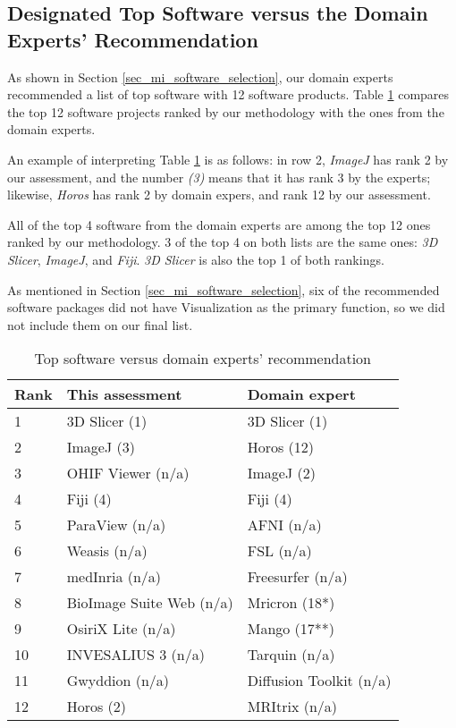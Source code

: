\subsection{Designated Top Software versus the Domain Experts' Recommendation}
\label{sec_designation_vs_experts}

As shown in Section \ref{sec_mi_software_selection}, our domain experts recommended a list of top software with 12 software products. Table \ref{tab_top_software_vs_experts} compares the top 12 software projects ranked by our methodology with the ones from the domain experts.

An example of interpreting Table \ref{tab_top_software_vs_experts} is as follows: in row 2, \textit{ImageJ} has rank 2 by our assessment, and the number \textit{(3)} means that it has rank 3 by the experts; likewise, \textit{Horos} has rank 2 by domain expers, and rank 12 by our assessment.

All of the top 4 software from the domain experts are among the top 12 ones ranked by our methodology. 3 of the top 4 on both lists are the same ones: \textit{3D Slicer}, \textit{ImageJ}, and \textit{Fiji}. \textit{3D Slicer} is also the top 1 of both rankings.

As mentioned in Section \ref{sec_mi_software_selection}, six of the recommended software packages did not have Visualization as the primary function, so we did not include them on our final list.

\begin{table}[H]
\centering
\begin{tabular}{lll}
\hline
Rank & This assessment & Domain expert \\ \hline
1 & 3D Slicer (1) & 3D Slicer (1) \\
2 & ImageJ (3) & Horos (12) \\
3 & OHIF Viewer (n/a) & ImageJ (2) \\
4 & Fiji (4) & Fiji (4) \\
5 & ParaView (n/a) & AFNI (n/a) \\
6 & Weasis (n/a) & FSL (n/a) \\
7 & medInria (n/a) & Freesurfer (n/a) \\
8 & BioImage Suite Web (n/a) & Mricron (18*) \\
9 & OsiriX Lite (n/a) & Mango (17**) \\
10 & INVESALIUS 3 (n/a) & Tarquin (n/a) \\
11 & Gwyddion (n/a) & Diffusion Toolkit (n/a) \\
12 & Horos (2) & MRItrix (n/a) \\ \hline
\end{tabular}
\caption{\label{tab_top_software_vs_experts}Top software versus domain experts' recommendation}
\end{table}

